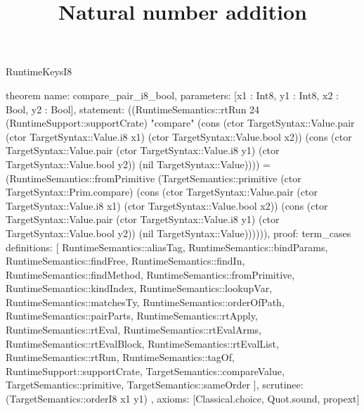 \begin{lexlean}{RuntimeKeysI8}
\title{Natural number addition}
\begin{semanticmodule}
theorem{
  name: compare_pair_i8_bool,
  parameters: [x1 : Int8, y1 : Int8, x2 : Bool, y2 : Bool],
  statement: ((RuntimeSemantics::rtRun 24 (RuntimeSupport::supportCrate) "compare" (cons (ctor TargetSyntax::Value.pair (ctor TargetSyntax::Value.i8 x1) (ctor TargetSyntax::Value.bool x2)) (cons (ctor TargetSyntax::Value.pair (ctor TargetSyntax::Value.i8 y1) (ctor TargetSyntax::Value.bool y2)) (nil TargetSyntax::Value)))) = (RuntimeSemantics::fromPrimitive (TargetSemantics::primitive (ctor TargetSyntax::Prim.compare) (cons (ctor TargetSyntax::Value.pair (ctor TargetSyntax::Value.i8 x1) (ctor TargetSyntax::Value.bool x2)) (cons (ctor TargetSyntax::Value.pair (ctor TargetSyntax::Value.i8 y1) (ctor TargetSyntax::Value.bool y2)) (nil TargetSyntax::Value)))))),
  proof: term_cases{
    definitions: [
      RuntimeSemantics::aliasTag,
      RuntimeSemantics::bindParams,
      RuntimeSemantics::findFree,
      RuntimeSemantics::findIn,
      RuntimeSemantics::findMethod,
      RuntimeSemantics::fromPrimitive,
      RuntimeSemantics::kindIndex,
      RuntimeSemantics::lookupVar,
      RuntimeSemantics::matchesTy,
      RuntimeSemantics::orderOfPath,
      RuntimeSemantics::pairParts,
      RuntimeSemantics::rtApply,
      RuntimeSemantics::rtEval,
      RuntimeSemantics::rtEvalArms,
      RuntimeSemantics::rtEvalBlock,
      RuntimeSemantics::rtEvalList,
      RuntimeSemantics::rtRun,
      RuntimeSemantics::tagOf,
      RuntimeSupport::supportCrate,
      TargetSemantics::compareValue,
      TargetSemantics::primitive,
      TargetSemantics::sameOrder
    ],
    scrutinee: (TargetSemantics::orderI8 x1 y1)
  },
  axioms: [Classical.choice, Quot.sound, propext]
}


\end{semanticmodule}
\end{lexlean}
